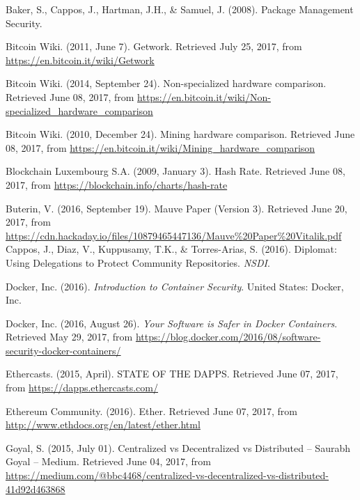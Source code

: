 \documentclass[a4paper,12pt]{article}
\begin{document}
{{\begin{thebibliography}{9}
Baker, S., Cappos, J., Hartman, J.H., \& Samuel, J. (2008). Package Management Security.

Bitcoin Wiki. (2011, June 7). Getwork. Retrieved July 25, 2017, from \href{https://en.bitcoin.it/wiki/Getwork}{https://en.bitcoin.it/wiki/Getwork}

Bitcoin Wiki. (2014, September 24). Non-specialized hardware comparison. Retrieved June 08, 2017, from \href{https://en.bitcoin.it/wiki/Non-specialized_hardware_comparison}{https://en.bitcoin.it/wiki/Non-specialized\_hardware\_comparison}

Bitcoin Wiki. (2010, December 24). Mining hardware comparison. Retrieved June 08, 2017, from \href{https://en.bitcoin.it/wiki/Mining_hardware_comparison}{https://en.bitcoin.it/wiki/Mining\_hardware\_comparison}

Blockchain Luxembourg S.A. (2009, January 3). Hash Rate. Retrieved June 08, 2017, from \href{https://blockchain.info/charts/hash-rate}{https://blockchain.info/charts/hash-rate}

Buterin, V. (2016, September 19). Mauve Paper (Version 3). Retrieved June 20, 2017, from \href{https://cdn.hackaday.io/files/10879465447136/Mauve\%20Paper\%20Vitalik.pdf}{https://cdn.hackaday.io/files/10879465447136/Mauve\%20Paper\%20Vitalik.pdf}
Cappos, J., Diaz, V., Kuppusamy, T.K., \& Torres-Arias, S. (2016). Diplomat: Using Delegations to Protect Community Repositories. \textit{NSDI}.

Docker, Inc. (2016). \textit{Introduction to Container Security}. United States: Docker, Inc.

Docker, Inc. (2016, August 26). \textit{Your Software is Safer in Docker Containers}. Retrieved May 29, 2017, from \href{https://blog.docker.com/2016/08/software-security-docker-containers/}{https://blog.docker.com/2016/08/software-security-docker-containers/}

Ethercasts. (2015, April). STATE OF THE DAPPS. Retrieved June 07, 2017, from \href{https://dapps.ethercasts.com/}{https://dapps.ethercasts.com/}

Ethereum Community. (2016). Ether. Retrieved June 07, 2017, from \href{http://www.ethdocs.org/en/latest/ether.html}{http://www.ethdocs.org/en/latest/ether.html}

Goyal, S. (2015, July 01). Centralized vs Decentralized vs Distributed – Saurabh Goyal – Medium. Retrieved June 04, 2017, from \href{https://medium.com/@bbc4468/centralized-vs-decentralized-vs-distributed-41d92d463868}{https://medium.com/@bbc4468/centralized-vs-decentralized-vs-distributed-41d92d463868}


\end{thebibliography}}}
\end{document}
